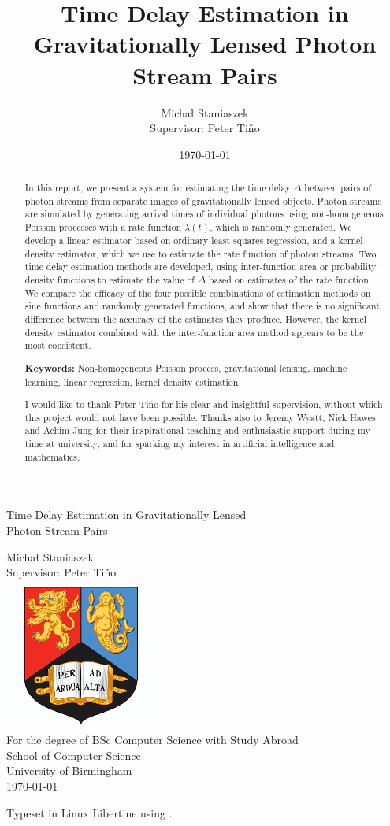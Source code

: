 \documentclass[a4paper,11pt,twoside]{article}
\title{Time Delay Estimation in Gravitationally Lensed Photon Stream Pairs}
\author{\Large{Micha{\l} Staniaszek} \\\small{Supervisor: Peter Ti{\v{n}}o}}
\date{\today}
\renewcommand{\maketitle}
{\begin{titlepage}
\pagenumbering{roman}
\begin{spacing}{1} 
\begin{large}
\begin{center}
\mbox{}
\vfill
\begin{sc}
Time Delay Estimation in Gravitationally Lensed\\ Photon Stream Pairs\\
\end{sc}
\vspace*{15mm}
Micha{\l} Staniaszek\\
Supervisor: Peter Ti{\v{n}}o\\
\vspace*{4mm}
\includegraphics[width=50mm,height=50mm]{images/crest.png}\\
For the degree of BSc Computer Science with Study Abroad\\
School of Computer Science\\
University of Birmingham\\
\vspace*{10mm}
\today
\vfill
\vspace*{.2in}
\end{center}
\end{large}
\end{spacing}
\end{titlepage}
}%
\begin{document}
\maketitle




\begin{abstract}
\noindent In this report, we present a system for estimating the time delay
$\Delta$ between pairs of photon streams from separate images of gravitationally
lensed objects. Photon streams are simulated by generating arrival times of
individual photons using non-homogeneous Poisson processes with a rate function
$\lambda(t)$, which is randomly generated. We develop a linear estimator based
on ordinary least squares regression, and a kernel density estimator, which we
use to estimate the rate function of photon streams. Two time delay estimation
methods are developed, using inter-function area or probability density
functions to estimate the value of $\Delta$ based on estimates of the rate
function. We compare the efficacy of the four possible combinations of
estimation methods on sine functions and randomly generated functions, and show
that there is no significant difference between the accuracy of the estimates
they produce. However, the kernel density estimator combined with the
inter-function area method appears to be the most consistent.

\vspace{1.0cm}\noindent\textbf{Keywords:} Non-homogeneous Poisson process, gravitational lensing,
machine learning, linear regression, kernel density estimation
\end{abstract}

\vspace{2.0cm}\renewcommand{\abstractname}{Acknowledgements}
\begin{abstract} 
\noindent I would like to thank Peter Ti{\v{n}}o for his clear
 and insightful supervision, without which this project would not have been
 possible. Thanks also to Jeremy Wyatt, Nick Hawes and Achim Jung for their
 inspirational teaching and enthusiastic support during my time at university,
 and for sparking my interest in artificial intelligence and mathematics.
\end{abstract}

\begin{center}
\vspace*{\fill}\scriptsize{Typeset in Linux Libertine using \XeLaTeX}.
\end{center}

\newpage
\tableofcontents
\newpage
{}
\end{document}
